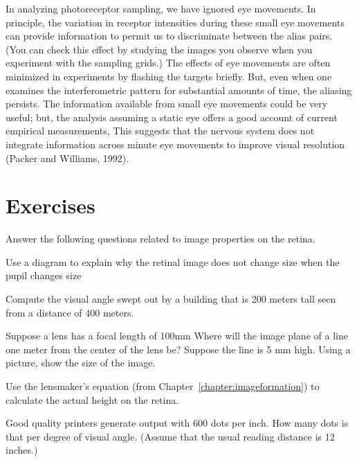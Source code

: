 In analyzing photoreceptor sampling, we have ignored
eye movements.
In principle, the variation in receptor intensities
during these small eye movements can provide
information to permit us to discriminate between the alias pairs.
(You can check this effect by studying the images you observe when you
experiment with the sampling grids.)
The effects of eye movements are often minimized in experiments
by flashing the targets briefly.
But, even when one examines the interferometric pattern for
substantial amounts of time, the aliasing persists.
The information available from small eye movements
could be very useful;
but, the analysis assuming
a static eye offers a good account
of current empirical measurements,
This suggests that the nervous system does not integrate
information across minute eye movements
to improve visual resolution (Packer and Williams, 1992).
\nocite{PackerWilliamsVR1992v32}


\newpage
\section*{Exercises}

\be  %

\item Answer the following 
questions related to image properties on the retina.

 \be
 \item  Use a diagram to explain why the retinal image does not change
size when the pupil changes size

 \item Compute the visual angle swept out by a building that is
200 meters tall seen from a distance of 400 meters.

 \item  Suppose a lens has a focal length of 100mm
Where will the image plane of a line one meter from the
center of the lens be?
Suppose the line is 5 mm high.
Using a picture, show the size of the image.

 \item Use the lensmaker's equation
(from Chapter~\ref{chapter:imageformation}) to calculate
the actual height on the retina.

 \item Good quality printers generate output with 600 dots per inch.
How many dots is that per degree of visual angle.
(Assume that the usual reading distance is 12 inches.)

